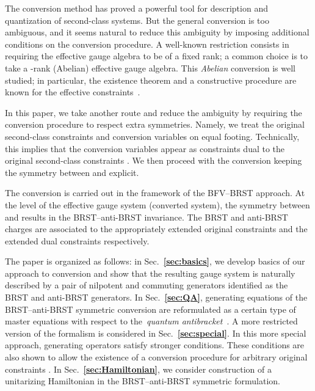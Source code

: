 \documentclass[a4paper,12pt]{amsart}
\numberwithin{equation}{section}
\providecommand{\bref}[1]{\textbf{\ref{#1}}}
\begin{document}
The conversion method has proved a powerful tool for description and
quantization of second-class systems.  But the general conversion is
too ambiguous, and it seems natural to reduce this ambiguity by
imposing additional conditions on the conversion procedure.  A
well-known restriction consists in requiring the effective gauge
algebra to be of a fixed rank; a common choice is to take a \coordHE{}-rank
(Abelian) effective gauge algebra.  This \textit{Abelian} conversion
is well studied; in particular, the existence theorem and a
constructive procedure are known for the effective
constraints~\cite{BT}.

In this paper, we take another route and reduce the ambiguity by
requiring the conversion procedure to respect extra symmetries.
Namely, we treat the original second-class constraints and conversion
variables on equal footing.  Technically, this implies that the
conversion variables appear as constraints \myHighlight{$\bar\theta^\alpha$}\coordHE{} dual to
the original second-class constraints \myHighlight{$\theta_\alpha$}\coordHE{}.  We then
proceed with the conversion keeping the symmetry between
\myHighlight{$\theta_\alpha$}\coordHE{} and \myHighlight{$\bar\theta^\alpha$}\coordHE{} explicit.


The conversion is carried out in the framework of the BFV--BRST
approach.  At the level of the effective gauge system (converted
system), the symmetry between \myHighlight{$\theta^\alpha$}\coordHE{} and \myHighlight{$\bar\theta^\alpha$}\coordHE{}
results in the BRST--anti-BRST invariance.  The BRST and anti-BRST charges
are associated to the appropriately
extended original constraints \myHighlight{$\theta_\alpha$}\coordHE{} and the extended dual
constraints \myHighlight{$\bar\theta^\alpha$}\coordHE{} respectively.


The paper is organized as follows: in Sec.~\bref{sec:basics}, we
develop basics of our approach to conversion and show that the
resulting gauge system is naturally described by a pair of nilpotent
and commuting generators identified as the BRST and anti-BRST
generators.  In Sec.~\bref{sec:QA}, generating equations of the
BRST--anti-BRST symmetric conversion are reformulated as a certain
type of master equations with respect to the~\textit{quantum
  antibracket}~\cite{BMQA}.  A more restricted version of the
formalism is considered in Sec.~\bref{sec:special}.  In this more
special approach, generating operators satisfy stronger conditions.
These conditions are also shown to allow the existence of a conversion
procedure for arbitrary original constraints \myHighlight{$\theta_\alpha$}\coordHE{}.  In
Sec.~\bref{sec:Hamiltonian}, we consider construction of a unitarizing
Hamiltonian in the BRST--anti-BRST symmetric formulation.
\end{document}
